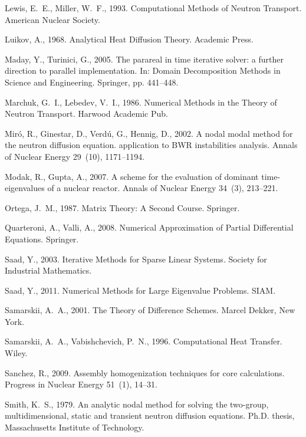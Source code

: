 \documentclass[a4paper]{jpconf}
\begin{document}
\begin{thebibliography}{50}
Lewis, E.~E., Miller, W.~F., 1993. Computational Methods of Neutron Transport.
  American Nuclear Society.

Luikov, A., 1968. Analytical Heat Diffusion Theory. Academic Press.

Maday, Y., Turinici, G., 2005. The parareal in time iterative solver: a further
  direction to parallel implementation. In: Domain Decomposition Methods in
  Science and Engineering. Springer, pp. 441--448.

Marchuk, G.~I., Lebedev, V.~I., 1986. Numerical Methods in the Theory of
  Neutron Transport. Harwood Academic Pub.

Mir{\'o}, R., Ginestar, D., Verd{\'u}, G., Hennig, D., 2002. A nodal modal
  method for the neutron diffusion equation. application to {BWR} instabilities
  analysis. Annals of Nuclear Energy 29~(10), 1171--1194.

Modak, R., Gupta, A., 2007. A scheme for the evaluation of dominant
  time-eigenvalues of a nuclear reactor. Annals of Nuclear Energy 34~(3),
  213--221.

Ortega, J.~M., 1987. Matrix Theory: A Second Course. Springer.

Quarteroni, A., Valli, A., 2008. Numerical Approximation of Partial
  Differential Equations. Springer.

Saad, Y., 2003. Iterative Methods for Sparse Linear Systems. Society for
  Industrial Mathematics.

Saad, Y., 2011. Numerical Methods for Large Eigenvalue Problems. SIAM.

Samarskii, A.~A., 2001. The Theory of Difference Schemes. Marcel Dekker, New
  York.

Samarskii, A.~A., Vabishchevich, P.~N., 1996. Computational Heat Transfer.
  Wiley.

Sanchez, R., 2009. Assembly homogenization techniques for core calculations.
  Progress in Nuclear Energy 51~(1), 14--31.

Smith, K.~S., 1979. An analytic nodal method for solving the two-group,
  multidimensional, static and transient neutron diffusion equations. Ph.D.
  thesis, Massachusetts Institute of Technology.


\end{thebibliography}
\end{document}
